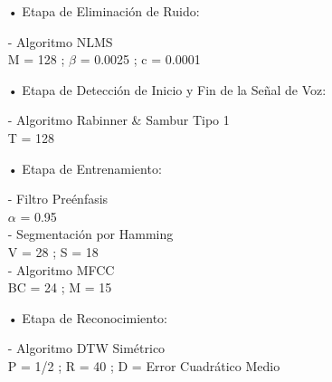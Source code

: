 \newpage
\begin{enumerate}

\item[•]Etapa de Eliminación de Ruido: 
\par
\hspace*{1cm} - Algoritmo NLMS \\
\hspace*{2cm} M = 128 ; \qquad $\beta$ = 0.0025 ; \qquad c = 0.0001

\item[•]Etapa de Detección de Inicio y Fin de la Señal de Voz: 
\par
\hspace*{1cm} - Algoritmo Rabinner \& Sambur Tipo 1 \\
\hspace*{2cm} T = 128

\item[•]Etapa de Entrenamiento: 
\par
\hspace*{1cm} - Filtro Preénfasis \\
\hspace*{2cm} $\alpha$ = 0.95 \\
\hspace*{1cm} - Segmentación por Hamming \\
\hspace*{2cm} V = 28 ; \qquad S = 18 \\
\hspace*{1cm} - Algoritmo MFCC \\
\hspace*{2cm} BC = 24 ; \qquad M = 15

\item[•]Etapa de Reconocimiento: 
\par
\hspace*{1cm} - Algoritmo DTW Simétrico \\
\hspace*{2cm} P = 1/2 ; \qquad R = 40 ; \qquad D = Error Cuadrático Medio \\

\end{enumerate}

